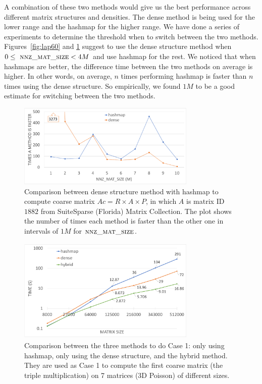 A combination of these two methods would give us the best performance across different matrix structures and densities. The dense method is being used for the lower range and the hashmap for the higher range.
We have done a series of experiments to determine the threshold when to switch between the two methods. Figures~\ref{fig:lap60} and \ref{fig:eco} suggest to use the dense structure method when $0 \le\ \textsc{nnz\_mat\_size} < 4M$ and use hashmap for the rest. We noticed that when hashmaps are better, the difference time between the two methods on average is higher. In other words, on average, $n$ times performing hashmap is faster than $n$ times using the dense structure. So empirically, we found $1M$ to be a good estimate for switching between the two methods.

\begin{figure}[tbh]
 \centering
 \includegraphics[width=8.5cm,height=4cm]{./figures/eco_range.pdf}
 \caption{Comparison between dense structure method with hashmap to compute coarse matrix $Ac = R \times A \times P$, in which $A$ is matrix ID $1882$ from SuiteSparse (Florida) Matrix Collection. The plot shows the number of times each method is faster than the other one in intervals of $1M$ for $\textsc{nnz\_mat\_size}$.}
 \label{fig:eco}
 \Description{}
\end{figure}

\begin{figure}[tbh]
 \centering
 \includegraphics[width=8.5cm,height=5cm]{./figures/mix.pdf}
 \caption{Comparison between the three methods to do Case 1: only using hashmap, only using the dense structure, and the hybrid method. They are used as Case 1 to compute the first coarse matrix (the triple multiplication) on 7 matrices (3D Poisson) of different sizes.}
 \label{fig:mix}
 \Description{}
\end{figure}

